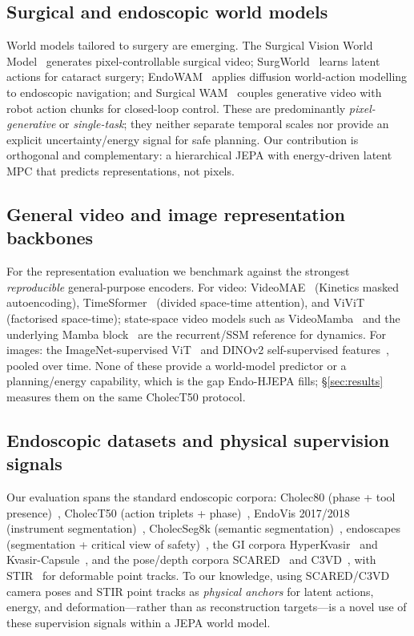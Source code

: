 \documentclass[final,3p,times,twocolumn]{elsarticle}
\begin{document}
\subsection{Surgical and endoscopic world models}
World models tailored to surgery are emerging. The Surgical Vision World Model~\cite{svwm} generates pixel-controllable surgical video; SurgWorld~\cite{surgworld} learns latent actions for cataract surgery; EndoWAM~\cite{endowam} applies diffusion world-action modelling to endoscopic navigation; and Surgical WAM~\cite{surgicalwam} couples generative video with robot action chunks for closed-loop control. These are predominantly \emph{pixel-generative} or \emph{single-task}; they neither separate temporal scales nor provide an explicit uncertainty/energy signal for safe planning. Our contribution is orthogonal and complementary: a hierarchical JEPA with energy-driven latent MPC that predicts representations, not pixels.

\subsection{General video and image representation backbones}
For the representation evaluation we benchmark against the strongest \emph{reproducible} general-purpose encoders. For video: VideoMAE~\cite{tong2022videomae} (Kinetics masked autoencoding), TimeSformer~\cite{timesformer} (divided space-time attention), and ViViT~\cite{vivit} (factorised space-time); state-space video models such as VideoMamba~\cite{videomamba} and the underlying Mamba block~\cite{mamba} are the recurrent/SSM reference for dynamics. For images: the ImageNet-supervised ViT~\cite{dosovitskiy2021vit} and DINOv2 self-supervised features~\cite{dinov2}, pooled over time. None of these provide a world-model predictor or a planning/energy capability, which is the gap Endo-HJEPA fills; \S\ref{sec:results} measures them on the same CholecT50 protocol.

\subsection{Endoscopic datasets and physical supervision signals}
Our evaluation spans the standard endoscopic corpora: Cholec80 (phase + tool presence)~\cite{twinanda2017endonet}, CholecT50 (action triplets + phase)~\cite{nwoye2022rendezvous,nwoye2022cholectsplit}, EndoVis 2017/2018 (instrument segmentation)~\cite{endovis2017}, CholecSeg8k (semantic segmentation)~\cite{hong2020cholecseg8k}, endoscapes (segmentation + critical view of safety)~\cite{endoscapes}, the GI corpora HyperKvasir~\cite{borgli2020hyperkvasir} and Kvasir-Capsule~\cite{kvasircapsule}, and the pose/depth corpora SCARED~\cite{allan2021scared} and C3VD~\cite{bobrow2023c3vd}, with STIR~\cite{stir2024} for deformable point tracks. To our knowledge, using SCARED/C3VD camera poses and STIR point tracks as \emph{physical anchors} for latent actions, energy, and deformation---rather than as reconstruction targets---is a novel use of these supervision signals within a JEPA world model.
\end{document}
